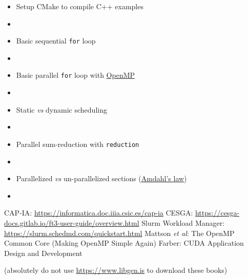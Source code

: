 \documentclass[12pt,aspectratio=169,xcolor=dvipsnames,hyperref={colorlinks,urlcolor=iiia_orange}]{beamer}
\begin{document}
\begin{frame}{}
    \begin{itemize}
        \setlength\itemsep{-1pt}
        \item[\faGithub] Setup CMake to compile C++ examples
        \item[] 
        \item[\faGithub] Basic sequential \texttt{for} loop
        \item[] 
        \item[\faGithub] Basic parallel \texttt{for} loop with \href{https://www.openmp.org}{OpenMP}
        \item[] 
        \item[\faGithub] Static \textit{vs} dynamic scheduling
        \item[] 
        \item[\faGithub] Parallel sum-reduction with \texttt{reduction}
        \item[] 
        \item[\faGithub] Parallelized \textit{vs} un-parallelized sections (\href{https://en.wikipedia.org/wiki/Amdahl\%27s_law}{Amdahl's law})
        \item[] 
    \end{itemize}
\end{frame}

\nocite{*}

\begin{frame}{}
    \begin{thebibliography}{9}
        \setlength\itemsep{3pt}
        \bibitem{} CAP-IA: \url{https://informatica.doc.iiia.csic.es/cap-ia}
        \bibitem{} CESGA: \url{https://cesga-docs.gitlab.io/ft3-user-guide/overview.html}
        \bibitem{} Slurm Workload Manager: \url{https://slurm.schedmd.com/quickstart.html}
        \bibitem{} Mattson \textit{et al}: The OpenMP Common Core (Making OpenMP Simple Again)
        \bibitem{} Farber: {CUDA} Application Design and Development
    \end{thebibliography}
    \footnotesize
    \vskip10pt
    \hfill{(absolutely do not use \url{https://www.libgen.is} to download these books)}
\end{frame}
\end{document}
